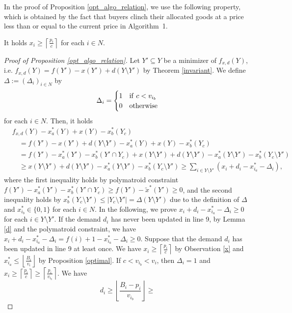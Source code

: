 \documentclass[letterpaper,11pt]{article}
\begin{document}
	In the proof of Proposition \ref{opt_algo_relation}, we use the following property, which is obtained by the fact that buyers clinch their allocated goods at a price less than or equal to the current price in Algorithm~1.
	\begin{observation}
	\label{x}
	It holds $x_i\geq \left\lceil \frac{p_i}{c}\right\rceil$ for each $i\in N$.
	\end{observation}
	\begin{proof}[Proof of Proposition \ref{opt_algo_relation}]
	Let $Y'\subseteq Y$ be a minimizer of $f_{x,d}(Y)$, i.e. 
	$f_{x,d}(Y)=f(Y')-x(Y')+d(Y\setminus Y')$
	by Theorem \ref{invariant}. 
	We define $\Delta:=(\Delta_i)_{i\in N}$ by 
	\[
	\Delta_i=
	\begin{cases}
	1& {\rm if}\ c< v_{i_{b}}\\
	0& {\rm otherwise}
	\end{cases}
	\]
	for each $i\in N$. Then, it holds 
	\begin{align*}
	&f_{x,d}(Y)-x_a^*(Y)+x(Y)-x_b^*(Y_c)\\
	&\quad=f(Y')-x(Y')+d(Y\setminus Y')-x_a^*(Y)+x(Y)-x_b^*(Y_c)\\
	&\quad=f(Y')-x_a^*(Y')-x_b^*(Y'\cap Y_c)+x(Y\setminus Y')+d(Y\setminus Y')-x_a^*(Y\setminus Y')-x_b^*(Y_c\setminus Y')\\
	&\quad\geq x(Y\setminus Y')+d(Y\setminus Y')-x_a^*(Y\setminus Y')-x_b^*(Y_c\setminus Y')
	\geq\sum_{i\in Y\setminus Y'}(x_i+d_i-x^*_{i_a}-\Delta_i), 
	\end{align*}
	where the first inequality holds by polymatroid constraint 
	$f(Y')-x_a^*(Y')-x_b^*(Y'\cap Y_c)\geq f(Y')-\tilde{x}^*(Y')\geq 0$, 
	and the second inequality holds by 
	$x^*_{b}(Y_c\setminus Y')\leq |Y_c\setminus Y'|=\Delta(Y\setminus Y')$ 
	due to the definition of $\Delta$ and $x^*_{i_b}\in\{0,1\}$ for each $i\in N$.
	In the following, we prove $x_i+d_i-x^*_{i_{a}}-\Delta_i\geq 0$ for each $i\in Y\setminus Y'$.
	If the demand $d_i$ has never been updated in line 9, 
	by Lemma \ref{d} and the polymatroid constraint, 
	we have $x_i+d_i-x^*_{i_{a}}-\Delta_i= f(i)+1-x^*_{i_{a}}-\Delta_i\geq 0$.
	Suppose that the demand $d_i$ has been updated in line 9 at least once.
	We have 
	$x_i\geq \left\lceil \frac{p_i}{c}\right\rceil$ 
	by Observation \ref{x} and $x^*_{i_{a}}\leq \left\lfloor\frac{B_i}{v_i}\right\rfloor$ by Proposition \ref{optimal}.
	If $c< v_{i_{b}}<v_i$, then $\Delta_i=1$ and 
	$x_i\geq \left\lceil \frac{p_i}{c}\right\rceil\geq\left\lceil \frac{p_i}{v_{i_{b}}}\right\rceil$. We have 
	\[
	d_i\geq \left\lfloor \frac{B_i-p_i}{v_{i_{b}}}\right\rfloor\geq 
\]
\end{proof}
\end{document}
